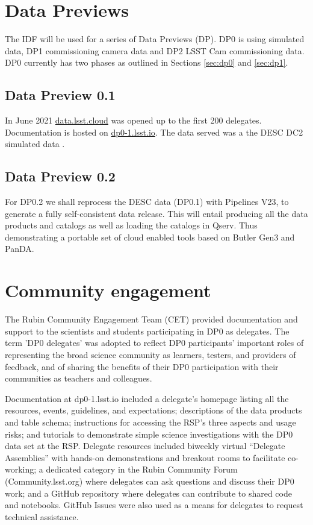 \section {Data Previews}
The IDF will be used for a series of Data Previews (DP). DP0 is using simulated data, DP1 commissioning camera data
and DP2 LSST Cam commissioning data. DP0 currently has two phases as outlined in Sections \ref{sec:dp0} and \ref {sec:dp1}.

\subsection{Data Preview 0.1}\label{sec:dp01}
In June 2021  \href{  data.lsst.cloud}{data.lsst.cloud} was opened up to the first 200 delegates.
Documentation is hosted on \href{ dp0-1.lsst.io}{ dp0-1.lsst.io}.
The data served was a the DESC DC2 simulated data \citep{arXiv:2010.05926}.



\subsection{Data Preview 0.2}\label{sec:dp02}
For DP0.2 we shall reprocess the DESC data (DP0.1) with Pipelines V23, to generate a fully self-consistent data release.
This will entail producing all the data products and catalogs as well as loading the  catalogs in Qserv.
Thus demonstrating a portable set of cloud enabled tools based on Butler Gen3 and PanDA.


\section{Community engagement }
The Rubin Community Engagement Team (CET) provided documentation and support to the scientists and students participating in DP0 as delegates.
The term 'DP0 delegates' was adopted to reflect DP0 participants’ important roles of representing the broad science community as learners, testers, and providers of feedback, and of sharing the benefits of their DP0 participation with their communities as teachers and colleagues.

Documentation at dp0-1.lsst.io included a delegate's homepage listing all the resources, events, guidelines, and expectations; descriptions of the data products and table schema; instructions for accessing the RSP's three aspects and usage risks; and tutorials to demonstrate simple science investigations with the DP0 data set at the RSP. 
Delegate resources included biweekly virtual “Delegate Assemblies” with hands-on demonstrations and breakout rooms to facilitate co-working; a dedicated category in the Rubin Community Forum (Community.lsst.org) where delegates can ask questions and discuss their DP0 work; and a GitHub repository where delegates can contribute to shared code and notebooks.
GitHub Issues were also used as a means for delegates to request technical assistance.

